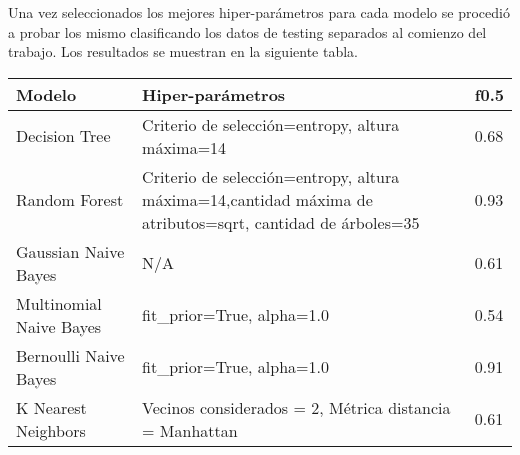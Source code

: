 Una vez seleccionados los mejores hiper-parámetros para cada modelo se procedió a probar los mismo clasificando los datos de testing separados al comienzo del trabajo.  Los resultados se muestran en la siguiente tabla. 
\begin{center}
    \begin{tabular}{ | l |  p{8cm} | l |}
    \hline
    \textbf{Modelo} & \textbf{Hiper-parámetros} & \textbf{f0.5} \\ \hline
Decision Tree & Criterio de selección=entropy, altura máxima=14 & 0.68  \\ \hline
 Random Forest & Criterio de selección=entropy, altura máxima=14,cantidad máxima de atributos=sqrt, cantidad de árboles=35 & 0.93 \\ \hline
Gaussian Naive Bayes & N/A & 0.61 \\ \hline
Multinomial Naive Bayes & fit\_prior=True, alpha=1.0 & 0.54 \\ \hline
 Bernoulli Naive Bayes & fit\_prior=True, alpha=1.0 &  0.91 \\ \hline
K Nearest Neighbors & Vecinos considerados = 2, Métrica distancia =  Manhattan &   0.61 \\
    \hline
    \end{tabular}
\end{center}